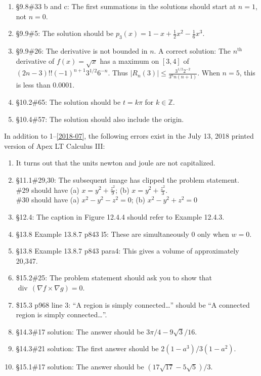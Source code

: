 \documentclass{amsart}
\newcommand{\ds}{\displaystyle}
\newcommand{\abs}[1]{\left\lvert#1\right\rvert}
\DeclareMathOperator{\divv}{div}
\begin{document}
\begin{enumerate}
\item \S9.8\#33 b and c: The first summations in the solutions should start at $n=1$, not $n=0$.
\item \S9.9\#5: The solution should be $p_3(x)=1-x+\frac12 x^2-\frac16 x^3$.
\item \S9.9\#26: The derivative is not bounded in $n$.  A correct solution: The $n^{\text{th}}$ derivative of $f(x)=\sqrt x$ has a maximum on $[3,4]$ of $(2n-3)!!(-1)^{n+1}3^{1/2}6^{-n}$.  Thus $\abs{R_n(3)}\leq \frac{3^{1/2}2^{-2}}{3^n n(n+1)}$. When $n=5$, this is less than $0.0001$.
\item \S10.2\#65: The solution should be $t=k\pi$ for $k\in\mathbb{Z}$.
\item \S10.4\#57: The solution should also include the origin.
\label{2018-07IIplus}
\end{enumerate}\bigskip

In addition to 1--\ref{2018-07}, the following errors exist in the July 13, 2018 printed version of Apex LT Calculus III:
\begin{enumerate}
\item It turns out that the units newton and joule are not capitalized.
\item \S11.1\#29,30: The subsequent image has clipped the problem statement.\\
 \#29 should have (a) $\ds x=y^2+\frac{z^2}{9}$; (b) $\ds x=y^2+\frac{z^2}{3}$.\\
 \#30 should have (a) $\ds x^2-y^2-z^2=0$; (b) $x^2-y^2+z^2=0$
\item \S12.4: The caption in Figure 12.4.4 should refer to Example 12.4.3.
\item \S13.8 Example 13.8.7 p843 l5: These are simultaneously 0 only when $w=0$.
\item \S13.8 Example 13.8.7 p843 para4: This gives a volume of approximately 20{,}347.
\item \$15.2\#25: The problem statement should ask you to show that $\divv\,(\nabla f\times\nabla g) = 0$.
\item \$15.3 p968 line 3: ``A region is simply connected\ldots'' should be ``A connected region is simply connected\ldots''.
\item \S14.3\#17 solution: The answer should be $3\pi/4-9\sqrt3/16$.
\item \S14.3\#21 solution: The first answer should be $2(1-a^3)/3(1-a^2)$.
\item \S15.1\#17 solution: The answer should be $(17\sqrt{17} - 5\sqrt{5})/3$.
\label{2018-07IIIplus}
\end{enumerate}
\end{document}
